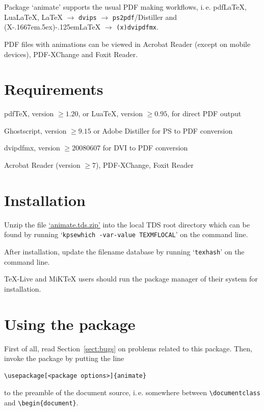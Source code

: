 \documentclass[a4paper]{article}
\def\pXepLaTeX{(X\kern-.1667em\lower.5ex\hbox{\reflectbox{E}})\kern-.125em\LaTeX}
\begin{document}
Package `animate' supports the usual PDF making workflows, i.\,e. pdf\LaTeX{}, Lua\LaTeX{}, \LaTeX{} $\rightarrow$ \verb+dvips+ $\rightarrow$ \verb+ps2pdf+/Distiller and \pXepLaTeX{} $\rightarrow$ \verb+(x)dvipdfmx+.

PDF files with animations can be viewed in Acrobat Reader (except on mobile devices), PDF-XChange and Foxit Reader.

\section{Requirements}
\begin{trivlist}
\item pdf\TeX{}, version $\ge1.20$, or Lua\TeX{}, version $\ge0.95$, for direct PDF output
\item Ghostscript, version $\ge9.15$ or Adobe Distiller for PS to PDF conversion
\item dvipdfmx, version $\ge20080607$ for DVI to PDF conversion
\item Acrobat Reader (version $\ge7$), PDF-XChange, Foxit Reader
\end{trivlist}

\section{Installation}
Unzip the file \href{http://mirrors.ctan.org/install/macros/latex/contrib/animate.tds.zip}{`animate.tds.zip'} into the local TDS root directory which can be found by running `\verb+kpsewhich -var-value TEXMFLOCAL+' on the command line.

After installation, update the filename database by running `\verb+texhash+' on the command line.

\TeX-Live and MiK\TeX{} users should run the package manager of their system for installation.

\section{Using the package}
First of all, read Section~\ref{sect:bugs} on problems related to this package. Then, invoke the package by putting the line
\begin{verbatim}
\usepackage[<package options>]{animate}
\end{verbatim}
to the preamble of the document source, i.\,e. somewhere between \verb+\documentclass+ and \verb+\begin{document}+.
\end{document}
